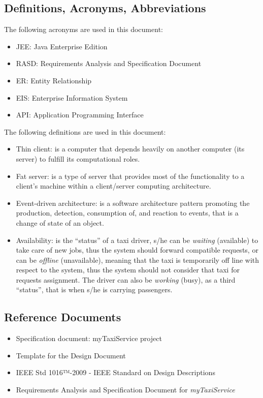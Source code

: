 \documentclass[a4paper,11pt]{report} %
\newcommand{\mts}{\mbox{\normalfont\itshape myTaxiService}}
\begin{document}
	\subsection{Definitions, Acronyms, Abbreviations}
	The following acronyms are used in this document:
	\begin{itemize}
		\item JEE: Java Enterprise Edition
		\item RASD: Requirements Analysis and Specification Document
		\item ER: Entity Relationship
		\item EIS: Enterprise Information System
		\item API: Application Programming Interface
	\end{itemize}
	The following definitions are used in this document:
	\begin{itemize}
		\item Thin client: is a computer that depends heavily on another computer (its server) to fulfill its computational roles.
		\item Fat server: is a type of server that provides most of the functionality to a client's machine within a client/server computing architecture.
		\item Event-driven architecture:  is a software architecture pattern promoting the production, detection, consumption of, and reaction to events, that is a change of state of an object.
		\item Availability: is the ``status'' of a taxi driver, s/he can be \textit{waiting} (available) to take care of new jobs, thus the system should forward compatible requests, or can be \textit{offline} (unavailable), meaning that the taxi is temporarily off line with respect to the system, thus the system should not consider that taxi for requests assignment. The driver can also be \textit{working} (busy), as a third ``status'', that is when s/he is carrying passengers.
	\end{itemize}
	
	\subsection{Reference Documents}
	\begin{itemize}
		\item Specification document: myTaxiService project
		\item Template for the Design Document
		\item IEEE Std 1016™-2009 - IEEE Standard on Design Descriptions
		\item Requirements Analysis and Specification Document for \mts{}
	\end{itemize}
	
\end{document}
